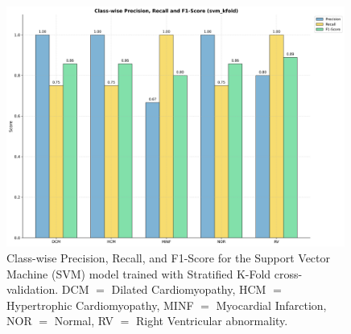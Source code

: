 \begin{figure}[H]
	\begin{center}
		\includegraphics[width=0.99\textwidth]{../images/metrics/svm/svm_kfold_class_wise_metrics.png}
	\end{center}
	\caption{Class-wise Precision, Recall, and F1-Score for the Support Vector
		Machine (SVM) model trained with Stratified K-Fold cross-validation. DCM $=$
		Dilated Cardiomyopathy, HCM $=$ Hypertrophic Cardiomyopathy, MINF $=$
		Myocardial Infarction, NOR $=$ Normal, RV $=$ Right Ventricular abnormality.}
	\label{fig:fig4}
\end{figure}
